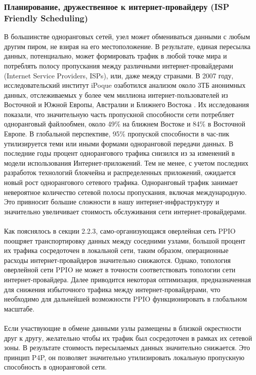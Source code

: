 \documentclass[10pt,a4paper]{article}
\begin{document}
\subsubsection{Планирование, дружественное к интернет-провайдеру (ISP Friendly Scheduling)}  %
В большинстве одноранговых сетей, узел может обмениваться данными с любым другим пиром, не взирая на его местоположение. В результате, единая пересылка данных, потенциально, может формировать трафик в любой точке мира и потреблять полосу пропускания между различными интернет-провайдерами (Internet Service Providers, ISPs), или, даже между странами. В 2007 году, исследовательский институт iPoque озаботился анализом около 3ТБ анонимных данных, отслеживаемых у более чем миллиона интернет-пользователей из Восточной и Южной Европы, Австралии и  Ближнего Востока \cite{article26}. Их исследования показали, что значительную часть пропускной способности сети потребляет одноранговый файлообмен, около 49\% на ближнем Востоке и 84\% в Восточной Европе. В глобальной перспективе, 95\% пропуской способности в час-пик утилизируется теми или иными формами одноранговой передачи данных. В последние годы процент однорангового трафика снизился из за изменений в модели использования Интернет-приложений. Тем не менее, с учетом последних разработок технологий блокчейна и распределенных приложений, ожидается новый рост однорангового сетевого трафика. Одноранговый трафик занимает невероятное количество сетевой полосы пропускания, включая международную. Это привносит большие сложности в нашу интернет-инфраструктуру и значительно увеличивает стоимость обслуживания сети интернет-провайдерами.
\vspace{-0.5em}
\\ \\Как пояснялось в секции 2.2.3, само-организующаяся оверлейная сеть PPIO поощряет транспортировку данных между соседними узлами, большой процент их трафика сосредоточен в локальной сети, таким образом, операционные расходы интернет-провайдеров значительно снижаются. Однако, топология оверлейной сети PPIO не может в точности соответствовать топологии сети интернет-провайдера. Далее приводится некоторая оптимизация, предназначенная для снижения избыточного трафика между интернет-провайдерами, что необходимо для дальнейшей возможности PPIO функционировать в глобальном масштабе.
 \vspace{-0.5em}
\\ \\Если участвующие в обмене данными узлы размещены в близкой окрестности друг к другу, желательно чтобы их трафик был сосредоточен в рамках их сетевой зоны. В результате стоимость пересылаемых данных значительно снижается. Это принцип P4P, он позволяет значительно утилизировать локальную пропускную способность в одноранговой сети.
\end{document}
